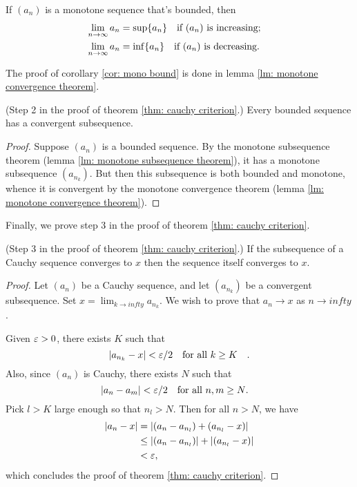 \documentclass[10pt]{article}
\begin{document}
	\begin{corollary} \label{cor: mono bound}
		If $(a_n)$ is a monotone sequence that's bounded, then
		\begin{align}
			\lim_{n \to \infty} a_n &= \sup\{a_n\} \qq{if $(a_n)$ is increasing;} \\
			\lim_{n \to \infty} a_n &= \inf\{a_n\} \qq{if $(a_n)$ is decreasing.}
		\end{align}
	\end{corollary}
	The proof of corollary \ref{cor: mono bound} is done in lemma \ref{lm: monotone convergence theorem}.
	\begin{proposition}
		(Step 2 in the proof of theorem \ref{thm: cauchy criterion}.) Every bounded sequence has a convergent subsequence.
	\end{proposition}
	\begin{proof}
		Suppose $(a_n)$ is a bounded sequence. By the monotone subsequence theorem (lemma \ref{lm: monotone subsequence theorem}), it has a monotone subsequence $(a_{n_k})$. But then this subsequence is both bounded and monotone, whence it is convergent by the monotone convergence theorem (lemma \ref{lm: monotone convergence theorem}).
	\end{proof}
	Finally, we prove step 3 in the proof of theorem \ref{thm: cauchy criterion}.
	\begin{proposition}
		(Step 3 in the proof of theorem \ref{thm: cauchy criterion}.) If the subsequence of a Cauchy sequence converges to $x$ then the sequence itself converges to $x$.
	\end{proposition}
	\begin{proof}
		Let $(a_n)$ be a Cauchy sequence, and let $(a_{n_k})$ be a convergent subsequence. Set $x = \lim_{k \to infty} a_{n_k}$. We wish to prove that $a_n \to x$ as $n \to infty$.

		Given $\varepsilon > 0$, there exists $K$ such that
		\begin{equation}
			\abs{a_{n_k} - x} < \veps / 2 \qq{for all $k \ge K$}.
		\end{equation}
		Also, since $(a_n)$ is Cauchy, there exists $N$ such that
		\begin{equation}
			\abs{a_n - a_m} < \veps /2 \qq{for all $n,m \ge N$.}
		\end{equation}
		Pick $l > K$ large enough so that $n_l > N$. Then for all $n > N$, we have
		\begin{align*}
			\abs{a_n - x} &= \abs{(a_n - a_{n_l}) + (a_{n_l} - x)} \\
			&\le \abs{(a_n - a_{n_l})} + \abs{(a_{n_l} - x)} \\
			&< \varepsilon,
		\end{align*}
		which concludes the proof of theorem \ref{thm: cauchy criterion}.

	\end{proof}
\end{document}
